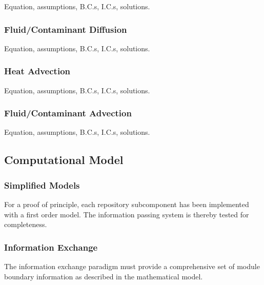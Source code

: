 Equation, assumptions, B.C.s, I.C.s, solutions.

\subsubsection{Fluid/Contaminant Diffusion}

Equation, assumptions, B.C.s, I.C.s, solutions.

\subsubsection{Heat Advection}

Equation, assumptions, B.C.s, I.C.s, solutions.

\subsubsection{Fluid/Contaminant Advection}

Equation, assumptions, B.C.s, I.C.s, solutions.

\subsection{Computational Model}

\subsubsection{Simplified Models}
For a proof of principle, each repository subcomponent has been 
implemented with a first order model. The information passing system 
is thereby tested for completeness. 

\subsubsection{Information Exchange}
The information exchange paradigm must provide a comprehensive set of 
module boundary information as described in the mathematical model.
